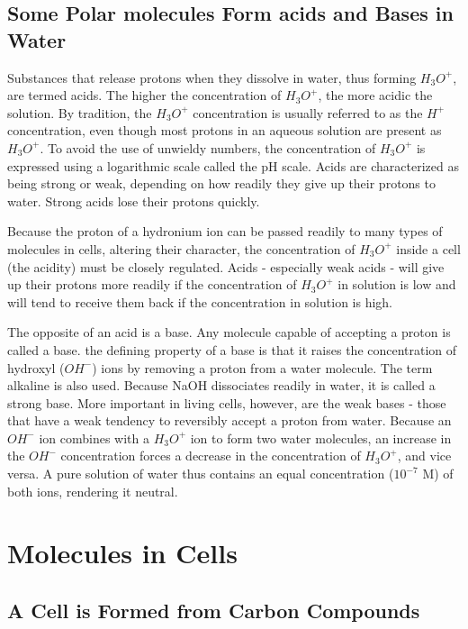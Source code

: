 \subsection{Some Polar molecules Form acids and Bases in Water}

Substances that release protons when they dissolve in water, thus forming
$H_{3}O^{+}$, are termed acids. The higher the concentration of $H_{3}O^{+}$, the
more acidic the solution.
By tradition, the $H_{3}O^{+}$ concentration is usually referred to as the $H^{+}$ concentration, even though
most protons in an aqueous solution are present as $H_{3}O^{+}$. To avoid the
use of unwieldy numbers, the concentration of $H_{3}O^{+}$ is expressed using
a logarithmic scale called the pH scale.
Acids are characterized as being strong or weak, depending on how
readily they give up their protons to water. Strong acids lose their protons quickly.

Because the proton of a hydronium ion can be passed readily to many
types of molecules in cells, altering their character, the concentration of
$H_{3}O^{+}$ inside a cell (the acidity) must be closely regulated. Acids - especially
weak acids - will give up their protons more readily if the concentration
of $H_{3}O^{+}$ in solution is low and will tend to receive them back if the concentration
in solution is high.

The opposite of an acid is a base. Any molecule capable of accepting a
proton is called a base.
the defining property of a base is that it raises the concentration
of hydroxyl ($OH^{-}$) ions by removing a proton from a water molecule.
The term alkaline is also used.
Because NaOH dissociates readily in water, it is called a strong base.
More important in living cells, however, are the weak bases - those that
have a weak tendency to reversibly accept a proton from water.
Because an $OH^{-}$ ion combines with a $H_{3}O^{+}$ ion to form two water molecules,
an increase in the $OH^{-}$ concentration forces a decrease in the
concentration of $H_{3}O^{+}$, and vice versa. A pure solution of water thus contains
an equal concentration ($10^{-7}$ M) of both ions, rendering it neutral.

\section{Molecules in Cells}

\subsection{A Cell is Formed from Carbon Compounds}


